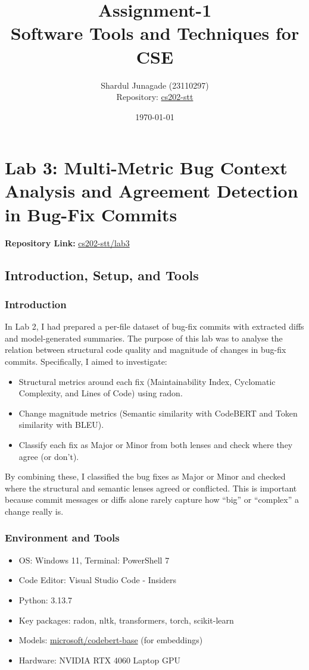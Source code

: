 \documentclass[10pt,a4paper]{report}
\title{\Huge Assignment-1 \\[0.5cm] \LARGE Software Tools and Techniques for CSE}
\author{\Large Shardul Junagade (23110297) \\[0.2cm] \Large Repository: \href{https://github.com/ShardulJunagade/cs202-stt}{cs202-stt}}
\date{\large \today}
\begin{document}
\maketitle
\newpage

\tableofcontents
\newpage


\chapter{Lab 3: Multi-Metric Bug Context Analysis and Agreement Detection in Bug-Fix Commits}

\textbf{Repository Link:} \href{https://github.com/ShardulJunagade/cs202-stt/tree/main/lab3}{cs202-stt/lab3}

\section{Introduction, Setup, and Tools}

\subsection{Introduction}
In Lab 2, I had prepared a per-file dataset of bug-fix commits with extracted diffs and model-generated summaries. The purpose of this lab was to analyse the relation between structural code quality and magnitude of changes in bug-fix commits. Specifically, I aimed to investigate:
\begin{itemize}[itemsep=0em, topsep=0pt]
    \item Structural metrics around each fix (Maintainability Index, Cyclomatic Complexity, and Lines of Code) using radon.
    \item Change magnitude metrics (Semantic similarity with CodeBERT and Token similarity with BLEU).
    \item Classify each fix as Major or Minor from both lenses and check where they agree (or don’t).
\end{itemize}

By combining these, I classified the bug fixes as Major or Minor and checked where the structural and semantic lenses agreed or conflicted. This is important because commit messages or diffs alone rarely capture how “big” or “complex” a change really is.

\subsection{Environment and Tools}
\begin{itemize}[itemsep=0em, topsep=0pt]
    \item OS: Windows 11, Terminal: PowerShell 7
    \item Code Editor: Visual Studio Code - Insiders
    \item Python: 3.13.7
    \item Key packages: radon, nltk, transformers, torch, scikit-learn
    \item Models: \href{https://huggingface.co/microsoft/codebert-base}{microsoft/codebert-base} (for embeddings)
    \item Hardware: NVIDIA RTX 4060 Laptop GPU
\end{itemize}
\end{document}
